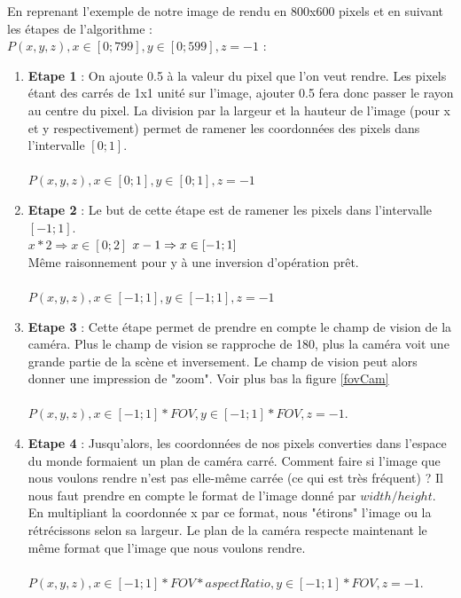 \documentclass[11pt]{article}
\begin{document}
En reprenant l'exemple de notre image de rendu en 800x600 pixels et en suivant les étapes de l'algorithme \label{conversionPixel}:\\
$P(x, y, z), x \in [0; 799], y \in [0; 599], z = -1$ :
\begin{enumerate}
	\item{\textbf{Etape 1} : On ajoute 0.5 à la valeur du pixel que l'on veut rendre. Les pixels étant des carrés de 1x1 unité sur l'image, ajouter 0.5 fera donc passer le rayon au centre du pixel. La division par la largeur et la hauteur de l'image (pour x et y respectivement) permet de ramener les coordonnées des pixels dans l'intervalle $[0; 1]$.\\
		\hfill\\
	         	$P(x, y, z), x \in [0; 1], y \in[0; 1], z = -1$}
	\item{\textbf{Etape 2} : Le but de cette étape est de ramener les pixels dans l'intervalle $[-1; 1]$.\\
		$x*2 \Rightarrow x \in [0; 2]$
		$\\x - 1 \Rightarrow x \in [-1; 1]$\\
		Même raisonnement pour y à une inversion d'opération prêt.\\
		\hfill\\
	          	$P(x, y, z), x \in [-1; 1], y \in[-1; 1], z = -1$}
	\item{\textbf{Etape 3} : Cette étape permet de prendre en compte le champ de vision de la caméra. Plus le champ de vision se rapproche de 180\degree, plus la caméra voit une grande partie de la scène et inversement. Le champ de vision peut alors donner une impression de "zoom". Voir plus bas la figure \ref{fovCam}\\\hfill\\
		$P(x,y , z), x \in [-1; 1]*FOV, y \in [-1; 1]*FOV, z = -1$.}\\
	\item{\textbf{Etape 4} : Jusqu'alors, les coordonnées de nos pixels converties dans l'espace du monde formaient un plan de caméra carré. Comment faire si l'image que nous voulons rendre n'est pas elle-même carrée (ce qui est très fréquent) ? Il nous faut prendre en compte le format de l'image donné par $width/height$. En multipliant la coordonnée x par ce format, nous "étirons" l'image ou la rétrécissons selon sa largeur. Le plan de la caméra respecte maintenant le même format que l'image que nous voulons rendre.\\\hfill\\
		$P(x,y , z), x \in [-1; 1]*FOV*aspectRatio, y \in [-1; 1]*FOV, z = -1$.}
\end{enumerate}
\end{document}
